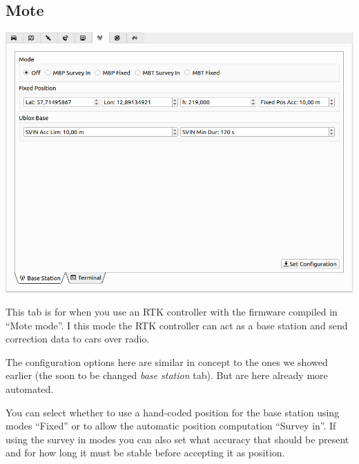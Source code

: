 \documentclass[12pt]{article} %
\def\printtodos{0}
\newcommand{\todo}[1]{
  \if\printtodos1
      {\color{red} \textbf{TODO:} #1}
  \fi}
\begin{document}
\subsection{Mote}
\noindent\begin{minipage}{0.5\linewidth}
\noindent \includegraphics[width=\textwidth]{./screens/mote.png}
\end{minipage}
\begin{minipage}{0.5\linewidth}
  This tab is for when you use an RTK controller with the firmware
  compiled in ``Mote mode''.  I this mode the RTK controller can act
  as a base station and send correction data to cars over radio.

  The configuration options here are similar in concept to the ones we
  showed earlier (the soon to be changed {\em base station} tab). But are here
  already more automated.

  You can select whether to use a hand-coded position for the base
  station using modes ``Fixed'' or to allow the automatic position
  computation ``Survey in''.  If using the survey in modes you can
  also set what accuracy that should be present and for how long it
  must be stable before accepting it as position.
\end{minipage}


\end{document}
